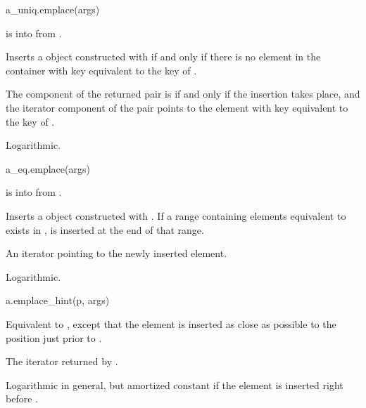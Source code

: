%
\begin{itemdecl}
a_uniq.emplace(args)
\end{itemdecl}

\begin{itemdescr}
\pnum
\result
{}

\pnum
\expects
{} is
 into  from .

\pnum
\effects
Inserts a  object 
constructed with 
if and only if there is no element in the container
with key equivalent to the key of .

\pnum
\returns
The  component of the returned pair is 
if and only if the insertion takes place, and
the iterator component of the pair points to
the element with key equivalent to the key of .

\pnum
\complexity
Logarithmic.
\end{itemdescr}

%
\begin{itemdecl}
a_eq.emplace(args)
\end{itemdecl}

\begin{itemdescr}
\pnum
\result
{}

\pnum
\expects
{} is
 into  from .

\pnum
\effects
Inserts a  object 
constructed with .
If a range containing elements equivalent to  exists in ,
 is inserted at the end of that range.

\pnum
\returns
An iterator pointing to the newly inserted element.

\pnum
\complexity
Logarithmic.
\end{itemdescr}

%
\begin{itemdecl}
a.emplace_hint(p, args)
\end{itemdecl}

\begin{itemdescr}
\pnum
\result
{}

\pnum
\effects
Equivalent to ,
except that the element is inserted as close as possible to
the position just prior to .

\pnum
\returns
The iterator returned by .

\pnum
\complexity
Logarithmic in general, but
amortized constant if the element is inserted right before .
\end{itemdescr}

